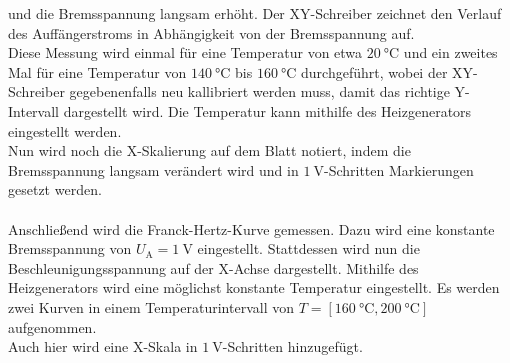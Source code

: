     und die Bremsspannung langsam erhöht.
    Der XY-Schreiber zeichnet den Verlauf des Auffängerstroms in Abhängigkeit von der Bremsspannung auf.\\
    Diese Messung wird einmal für eine Temperatur von etwa $\SI{20}{\celsius}$
    und ein zweites Mal für eine Temperatur von $\SI{140}{\celsius}$ bis $\SI{160}{\celsius}$ durchgeführt,
    wobei der XY-Schreiber gegebenenfalls neu kallibriert werden muss,
    damit das richtige Y-Intervall dargestellt wird.
    Die Temperatur kann mithilfe des Heizgenerators eingestellt werden.\\
    Nun wird noch die X-Skalierung auf dem Blatt notiert,
    indem die Bremsspannung langsam verändert wird und in $\SI{1}{\volt}$-Schritten Markierungen gesetzt werden.\\
    \\
    Anschließend wird die Franck-Hertz-Kurve gemessen.
    Dazu wird eine konstante Bremsspannung von $U_\text{A} = \SI{1}{\volt}$ eingestellt.
    Stattdessen wird nun die Beschleunigungsspannung auf der X-Achse dargestellt.
    Mithilfe des Heizgenerators wird eine möglichst konstante Temperatur eingestellt.
    Es werden zwei Kurven in einem Temperaturintervall von $T = [\SI{160}{\celsius}, \SI{200}{\celsius}]$ aufgenommen.\\
    Auch hier wird eine X-Skala in $\SI{1}{\volt}$-Schritten hinzugefügt.
